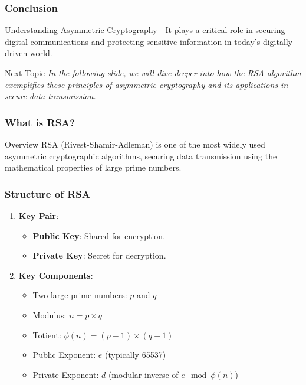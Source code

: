 \documentclass{beamer}
\begin{document}
\begin{frame}[fragile]
    \frametitle{Conclusion}
    \begin{block}{Understanding Asymmetric Cryptography}
        - It plays a critical role in securing digital communications and protecting sensitive information in today’s digitally-driven world.
    \end{block}
    \begin{block}{Next Topic}
        \textit{In the following slide, we will dive deeper into how the RSA algorithm exemplifies these principles of asymmetric cryptography and its applications in secure data transmission.}
    \end{block}
\end{frame}

\begin{frame}[fragile]
    \frametitle{What is RSA?}
    \begin{block}{Overview}
        RSA (Rivest-Shamir-Adleman) is one of the most widely used asymmetric cryptographic algorithms, securing data transmission using the mathematical properties of large prime numbers.
    \end{block}
\end{frame}

\begin{frame}[fragile]
    \frametitle{Structure of RSA}
    \begin{enumerate}
        \item \textbf{Key Pair}:
        \begin{itemize}
            \item \textbf{Public Key}: Shared for encryption.
            \item \textbf{Private Key}: Secret for decryption.
        \end{itemize}
        
        \item \textbf{Key Components}:
        \begin{itemize}
            \item Two large prime numbers: \( p \) and \( q \)
            \item Modulus: \( n = p \times q \)
            \item Totient: \( \phi(n) = (p-1) \times (q-1) \)
            \item Public Exponent: \( e \) (typically 65537)
            \item Private Exponent: \( d \) (modular inverse of \( e \mod \phi(n) \))
        \end{itemize}
    \end{enumerate}
\end{frame}
\end{document}
